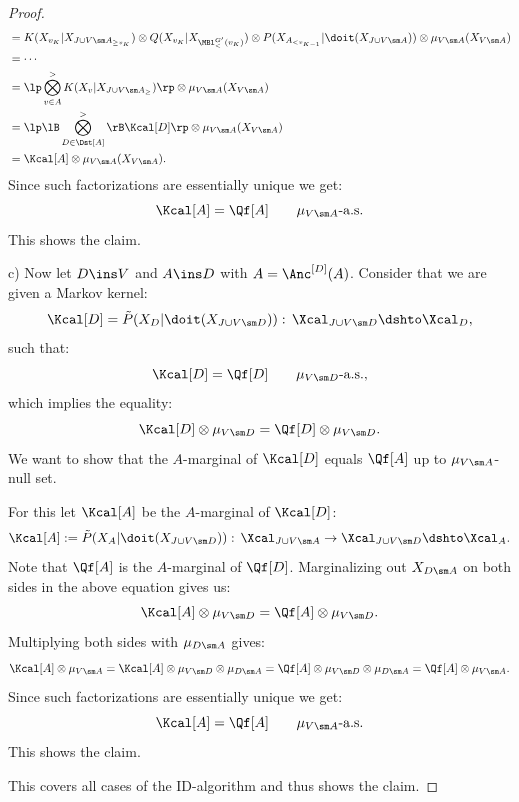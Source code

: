 \begin{Thm}
\begin{proof}
\begin{align*}
           & = K(X_{v_K}|X_{J \cup V \sm A_{\ge v_K}}) \otimes Q(X_{v_K}|X_{\MBl^{G'}_<(v_K)}) \otimes P(X_{A_{< v_{K-1}}}|\doit(X_{J \cup V \sm A})) \otimes \mu_{V \sm A}(X_{V \sm A}) \\
           & = \cdots \\
           & = \lp \bigotimes_{v \in A}^> K(X_v|X_{J \cup V \sm A_\ge}) \rp \otimes \mu_{V \sm A}(X_{V \sm A})\\
           &=  \lp \lB \bigotimes_{D \in \Dst[A]}^> \rB \Kcal[D] \rp\otimes \mu_{V \sm A}(X_{V \sm A})\\
           &= \Kcal[A] \otimes \mu_{V \sm A}(X_{V \sm A}).
        \end{align*}
        Since such factorizations are essentially unique we get:
               \[ \Kcal[A] = \Qf[A] \qquad \mu_{V\sm A}\text{-a.s.} \]
        This shows the claim.

       c) Now let $D \ins V$ and $A \ins D$ with $A=\Anc^{[D]}(A)$. Consider that we are given a Markov kernel:
       \[ \Kcal[D]=\tilde P(X_{D}|\doit(X_{J \cup V \sm D})) :\, \Xcal_{J \cup V \sm D} \dshto \Xcal_{D}, \]
        such that:
       \[ \Kcal[D] = \Qf[D]\qquad \mu_{V\sm D}\text{-a.s.,}  \]
       which implies the equality:
            \[  \Kcal[D] \otimes \mu_{V\sm D} = \Qf[D]\otimes \mu_{V\sm D}. \]
            We want to show that the $A$-marginal of $\Kcal[D]$ equals $\Qf[A]$ up to $\mu_{V\sm A}$-null set.

        For this let $\Kcal[A]$ be the $A$-marginal of $\Kcal[D]$:
       \[ \Kcal[A]:=\tilde P(X_A|\doit(X_{J \cup V \sm D})) :\, \Xcal_{J \cup V \sm A} \to \Xcal_{J \cup V \sm D} \dshto \Xcal_A. \]
        Note that $\Qf[A]$ is the $A$-marginal of $\Qf[D]$.
        Marginalizing out $X_{D \sm A}$ on both sides in the above equation gives us:
         \[ \Kcal[A] \otimes \mu_{V\sm D} = \Qf[A]\otimes \mu_{V\sm D}. \]
        Multiplying both sides with $\mu_{D \sm A}$ gives:
        \[ \Kcal[A] \otimes \mu_{V\sm A} = \Kcal[A] \otimes \mu_{V\sm D} \otimes \mu_{D \sm A} = \Qf[A]\otimes \mu_{V\sm D} \otimes \mu_{D \sm A} = \Qf[A] \otimes \mu_{V\sm A}. \]
        Since such factorizations are essentially unique we get:
               \[ \Kcal[A] = \Qf[A] \qquad \mu_{V\sm A}\text{-a.s.} \]
        This shows the claim.

        This covers all cases of the ID-algorithm and thus shows the claim.
    \end{proof}
\end{Thm}


